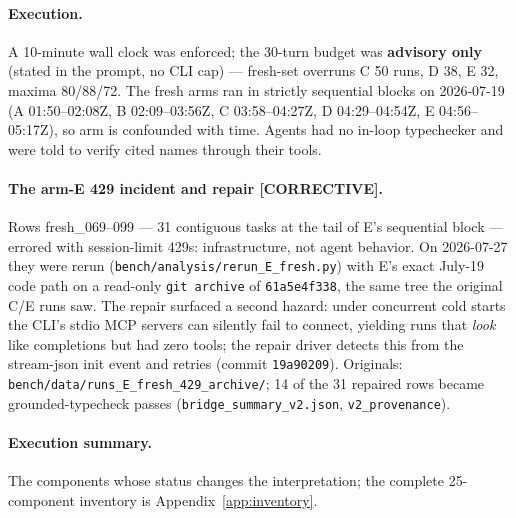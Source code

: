 \documentclass[10pt]{article}
\newcommand{\code}[1]{\texttt{#1}}
\begin{document}
\paragraph{Execution.} A 10-minute wall clock was enforced; the 30-turn
budget was \textbf{advisory only} (stated in the prompt, no CLI cap) ---
fresh-set overruns C 50 runs, D 38, E 32, maxima 80/88/72. The fresh arms
ran in strictly sequential blocks on 2026-07-19 (A 01:50--02:08Z,
B 02:09--03:56Z, C 03:58--04:27Z, D 04:29--04:54Z, E 04:56--05:17Z), so
arm is confounded with time. Agents had no in-loop typechecker and were
told to verify cited names through their tools.

\paragraph{The arm-E 429 incident and repair [CORRECTIVE].} Rows
fresh\_069--099 --- 31 contiguous tasks at the tail of E's sequential
block --- errored with session-limit 429s: infrastructure, not agent
behavior. On 2026-07-27 they were rerun
(\code{bench/analysis/rerun\_E\_fresh.py}) with E's exact July-19 code
path on a read-only \code{git archive} of \code{61a5e4f338}, the same tree
the original C/E runs saw. The repair surfaced a second hazard: under
concurrent cold starts the CLI's stdio MCP servers can silently fail to
connect, yielding runs that \emph{look} like completions but had zero
tools; the repair driver detects this from the stream-json init event and
retries (commit \code{19a90209}). Originals:
\code{bench/data/runs\_E\_fresh\_429\_archive/}; 14 of the 31 repaired
rows became grounded-typecheck passes (\code{bridge\_summary\_v2.json},
\code{v2\_provenance}).

\paragraph{Execution summary.} The components whose status changes the
interpretation; the complete 25-component inventory is
Appendix~\ref{app:inventory}.
\end{document}

